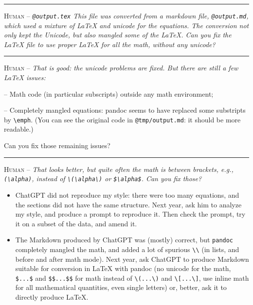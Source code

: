 \documentclass[a5paper]{article}
\providecommand{\tightlist}{%
  \setlength{\itemsep}{0pt}\setlength{\parskip}{0pt}}
\def\section#1{\clearpage{\vspace*{0cm}\LARGE\centering\bfseries #1\par\bigskip\bigskip}}
\begin{document}
\begin{center}\rule{0.5\linewidth}{0.5pt}\end{center}

\textsc{Human --}
\itshape
\texttt{@output.tex} This file was converted from a markdown file, \texttt{@output.md},
which used a mixture of \LaTeX{} and unicode for the equations.
The conversion not only kept the Unicode, but also mangled some of the \LaTeX{}.
Can you fix the \LaTeX{} file to use proper \LaTeX{} for all the math, without any unicode?
\upshape

\begin{center}\rule{0.5\linewidth}{0.5pt}\end{center}

\textsc{Human --}
\itshape
That is good: the unicode problems are fixed.
But there are still a few \LaTeX{} issues:

-- Math code (in particular subscripts) outside any math environment;

-- Completely mangled equations: pandoc seems to have replaced some substripts by \verb|\emph|.
(You can see the original code in \texttt{@tmp/output.md}: it should be more readable.)

Can you fix those remaining issues?
\upshape

\begin{center}\rule{0.5\linewidth}{0.5pt}\end{center}

\textsc{Human --}
\itshape
That looks better, but quite often the math is between brackets, e.g.,
\verb|(\alpha)|, instead of
\verb|\(\alpha\)| or
\verb|$\alpha$|.
Can you fix those?
\upshape

\section{Problems}

\begin{itemize}
\tightlist
\item ChatGPT did not reproduce my style: there were too many equations, and the sections did not have the same structure.
  Next year, ask him to analyze my style, and produce a prompt to reproduce it.
  Then check the prompt, try it on a subset of the data, and amend it.
\item The Markdown produced by ChatGPT was (mostly) correct, but \texttt{pandoc} completely mangled the math,
  and added a lot of spurious \verb|\\| (in lists, and before and after math mode).
  Next year, ask ChatGPT to produce Markdown suitable for conversion in \LaTeX{} with pandoc
  (no unicode for the math, \verb|$...$| and \verb|$$...$$| for math instead of \verb|\(...\)| and \verb|\[...\]|,
  use inline math for all mathematical quantities, even single letters)
  or, better, ask it to directly produce \LaTeX{}.
\end{itemize}
\clearpage
\end{document}
